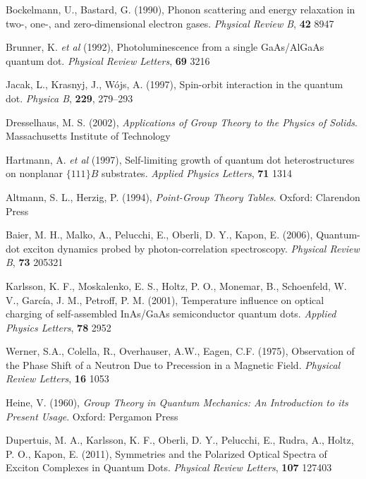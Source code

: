 \documentclass[12pt]{article}
\begin{document}
\begin{thebibliography}{10}
Bockelmann, U., Bastard, G. (1990), Phonon scattering and energy relaxation in two-, one-, and zero-dimensional electron gases. \textit{Physical Review B}, \textbf{42} 8947

Brunner, K. \textit{et al} (1992), Photoluminescence from a single GaAs/AlGaAs quantum dot. \textit{Physical Review Letters}, \textbf{69} 3216

Jacak, L., Krasnyj, J., Wójs, A. (1997), Spin-orbit interaction in the quantum dot. \textit{Physica B}, \textbf{229}, 279--293

Dresselhaus, M. S. (2002), \textit{Applications of Group Theory to the Physics of Solids}. Massachusetts Institute of Technology

Hartmann, A. \textit{et al} (1997), Self-limiting growth of quantum dot heterostructures on nonplanar $\{111\}B$ substrates. \textit{Applied Physics Letters}, \textbf{71} 1314

Altmann, S. L., Herzig, P. (1994), \textit{Point-Group Theory Tables}. Oxford: Clarendon Press

Baier, M. H., Malko, A., Pelucchi, E., Oberli, D. Y., Kapon, E. (2006), Quantum-dot exciton dynamics probed by photon-correlation spectroscopy. \textit{Physical Review B}, \textbf{73} 205321

Karlsson, K. F., Moskalenko, E. S., Holtz, P. O., Monemar, B., Schoenfeld, W. V., García, J. M., Petroff, P. M. (2001), Temperature influence on optical charging of self-assembled InAs/GaAs semiconductor quantum dots. \textit{Applied Physics Letters}, \textbf{78} 2952

Werner, S.A., Colella, R., Overhauser, A.W., Eagen, C.F. (1975), Observation of the Phase Shift of a Neutron Due to Precession in a Magnetic Field. \textit{Physical Review Letters}, \textbf{16} 1053

Heine, V. (1960), \textit{Group Theory in Quantum Mechanics: An Introduction to its Present Usage}. Oxford: Pergamon Press

Dupertuis, M. A., Karlsson, K. F., Oberli, D. Y., Pelucchi, E., Rudra, A., Holtz, P. O., Kapon, E. (2011), Symmetries and the Polarized Optical Spectra of Exciton Complexes in Quantum Dots. \textit{Physical Review Letters}, \textbf{107} 127403


\end{thebibliography}



%





\end{document}
